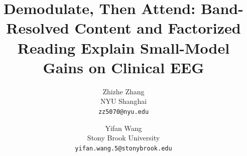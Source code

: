 \documentclass[10pt,twocolumn,letterpaper]{article}
\title{Demodulate, Then Attend: Band-Resolved Content and Factorized Reading Explain Small-Model Gains on Clinical EEG}
\author{Zhizhe Zhang\\
NYU Shanghai\\
{\tt\small zz5070@nyu.edu}
\and
Yifan Wang\\
Stony Brook University\\
{\tt\small yifan.wang.5@stonybrook.edu}
}
\begin{document}
\maketitle









{
    \small
    
    
}


\end{document}
